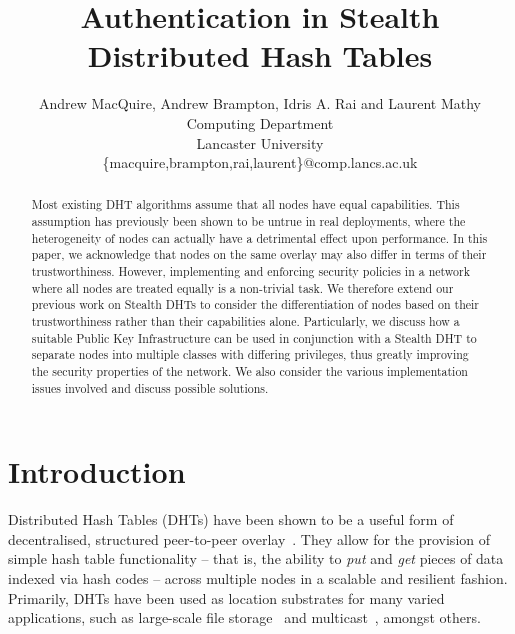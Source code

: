 \documentclass[pdftex,conference,10pt]{IEEEtran}
\title{Authentication in Stealth Distributed Hash Tables}
\author{
   Andrew MacQuire, Andrew Brampton,
   Idris A. Rai and Laurent Mathy\\
   Computing Department\\
   Lancaster University\\
   {\{macquire,brampton,rai,laurent\}@comp.lancs.ac.uk}
}
\begin{document}
\maketitle

\begin{abstract}
Most existing DHT algorithms assume that all nodes have equal
capabilities. This assumption has previously been shown to be untrue in
real deployments, where the heterogeneity of nodes can actually have a
detrimental effect upon performance. In this paper, we acknowledge that
nodes on the same overlay may also differ in terms of their
trustworthiness. However, implementing and enforcing security policies
in a network where all nodes are treated equally is a non-trivial task.
We therefore extend our previous work on Stealth DHTs to consider the
differentiation of nodes based on their trustworthiness rather than
their capabilities alone. Particularly, we discuss how a suitable
Public Key Infrastructure can be used in conjunction with a Stealth DHT
to separate nodes into multiple classes with differing privileges, thus
greatly improving the security properties of the network. We also
consider the various implementation issues involved and discuss
possible solutions.
\end{abstract}

\section{Introduction}
\label{sect-intro}

Distributed Hash Tables (DHTs) have been shown to be a useful form of
decentralised, structured peer-to-peer
overlay~\cite{Rowstron01Pastry}\cite{Stoica01Chord}\cite{Zhao01Tapestry}\cite{Ratnasamy01Scalable}.
They allow for the provision of simple hash table functionality -- that
is, the ability to \emph{put} and \emph{get} pieces of data indexed via
hash codes -- across multiple nodes in a scalable and resilient
fashion. Primarily, DHTs have been used as location substrates for many
varied applications, such as large-scale file
storage~\cite{Druschel01PAST}\cite{Dabek01Wide}\cite{Kubiatowicz00OceanStore}
and multicast~\cite{Rowstron01SCRIBE}\cite{Zhuang01Bayeux}, amongst
others.
\end{document}
